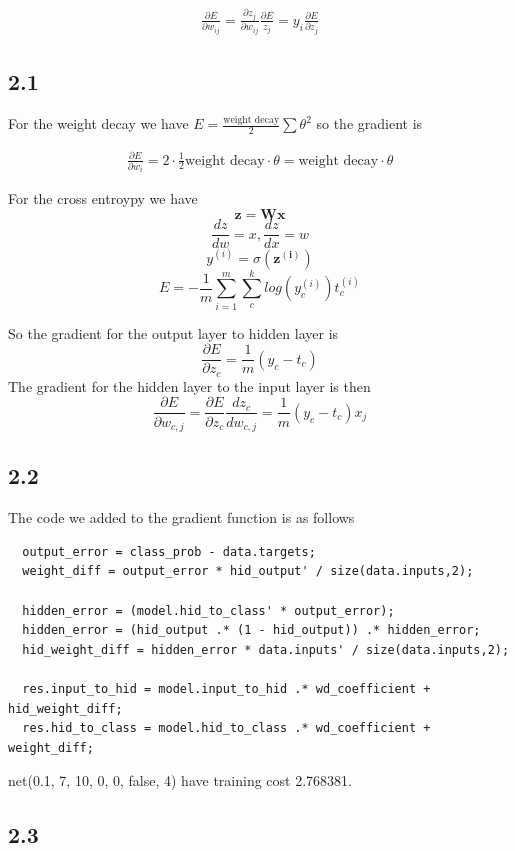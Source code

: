 \documentclass{article}
\begin{document}
\begin{align}
  \frac{\partial E}{\partial w_{ij}} = \frac{\partial z_j}{\partial w_{ij}} \frac{\partial E}{z_j} =
  y_i \frac{\partial E}{\partial z_j}
\end{align}

\subsection*{2.1}

For the weight decay we have
$E = \frac{\text{weight decay}}{2}\sum \theta^2$ so the gradient is

\begin{align}
  \nonumber \frac{\partial E}{\partial w_i} = 2 \cdot \frac{1}{2} \text{weight decay} \cdot \theta = \text{weight decay} \cdot \theta
\end{align}

For the cross entroypy we have
$$ \mathbf{z} = \mathbf{Wx}$$
$$\frac{dz}{dw} = x, \frac{dz}{dx} = w$$
$$ y^{(i)} = \sigma(\mathbf{z^{(i)}})$$
$$E = -\frac{1}{m} \sum_{i=1}^m \sum_c^k log(y^{(i)}_c)
t_c^{(i)} $$

So the gradient for the output layer to hidden layer is
$$ \frac{\partial E}{\partial z_c} =\frac{1}{m}(y_c - t_c) $$
The gradient for the hidden layer to the input layer is then
$$\frac{\partial E}{\partial w_{c,j}} = \frac{\partial E}{\partial z_c}\frac{dz_c}{dw_{c,j}}
= \frac{1}{m}(y_c - t_c)x_j$$
\subsection*{2.2}

The code we added to the gradient function is as follows

\begin{verbatim}
  output_error = class_prob - data.targets;
  weight_diff = output_error * hid_output' / size(data.inputs,2);

  hidden_error = (model.hid_to_class' * output_error);
  hidden_error = (hid_output .* (1 - hid_output)) .* hidden_error;
  hid_weight_diff = hidden_error * data.inputs' / size(data.inputs,2);

  res.input_to_hid = model.input_to_hid .* wd_coefficient + hid_weight_diff;
  res.hid_to_class = model.hid_to_class .* wd_coefficient + weight_diff;
\end{verbatim}

net(0.1, 7, 10, 0, 0, false, 4) have training cost 2.768381.

\subsection*{2.3}
\end{document}
